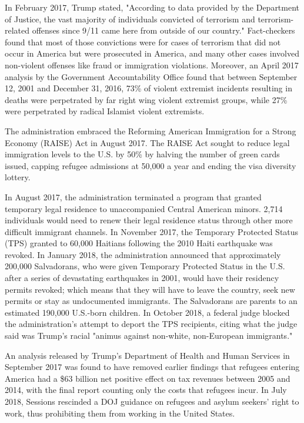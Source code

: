 In February 2017, Trump stated, "According to data provided by the
Department of Justice, the vast majority of individuals convicted of
terrorism and terrorism-related offenses since 9/11 came here from
outside of our country." Fact-checkers found that most of those
convictions were for cases of terrorism that did not occur in America
but were prosecuted in America, and many other cases involved
non-violent offenses like fraud or immigration violations. Moreover, an
April 2017 analysis by the Government Accountability Office found that
between September 12, 2001 and December 31, 2016, 73\% of violent
extremist incidents resulting in deaths were perpetrated by far right
wing violent extremist groups, while 27\% were perpetrated by radical
Islamist violent extremists.

The administration embraced the Reforming American Immigration for a
Strong Economy (RAISE) Act in August 2017. The RAISE Act sought to
reduce legal immigration levels to the U.S. by 50\% by halving the
number of green cards issued, capping refugee admissions at 50,000 a
year and ending the visa diversity lottery.

In August 2017, the administration terminated a program that granted
temporary legal residence to unaccompanied Central American minors.
2,714 individuals would need to renew their legal residence status
through other more difficult immigrant channels. In November 2017, the
Temporary Protected Status (TPS) granted to 60,000 Haitians following
the 2010 Haiti earthquake was revoked. In January 2018, the
administration announced that approximately 200,000 Salvadorans, who
were given Temporary Protected Status in the U.S. after a series of
devastating earthquakes in 2001, would have their residency permits
revoked; which means that they will have to leave the country, seek new
permits or stay as undocumented immigrants. The Salvadorans are parents
to an estimated 190,000 U.S.-born children. In October 2018, a federal
judge blocked the administration's attempt to deport the TPS recipients,
citing what the judge said was Trump's racial "animus against non-white,
non-European immigrants."

An analysis released by Trump's Department of Health and Human Services
in September 2017 was found to have removed earlier findings that
refugees entering America had a \$63 billion net positive effect on tax
revenues between 2005 and 2014, with the final report counting only the
costs that refugees incur. In July 2018, Sessions rescinded a DOJ
guidance on refugees and asylum seekers' right to work, thus prohibiting
them from working in the United States.

